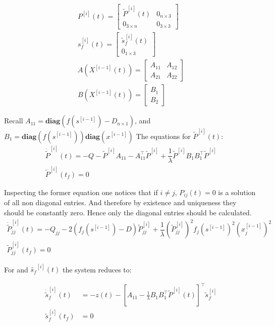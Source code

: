 \documentclass[3p,times]{elsarticle}
\newcommand{\diag}{\textbf{diag}}
\begin{document}
\begin{align}
P^{[i]}(t) = \begin{bmatrix}
\tilde{P}^{[i]}(t) & 0_{n\times 3} \\ 0_{3 \times n} & 0_{3 \times 3}
\end{bmatrix} \\
s_f^{[i]}(t) = \begin{bmatrix}
\tilde{s}_f^{[i]}(t) \\ 0_{1\times 3}
\end{bmatrix} \\
A\left (X^{[i-1]}(t)\right) = \begin{bmatrix}
A_{11} & A_{12} \\ A_{21} & A_{22}
\end{bmatrix} \\
B\left (X^{[i-1]}(t)\right) = \begin{bmatrix}
B_1 \\ B_2
\end{bmatrix} 
\end{align}


Recall $A_{11} = \diag \left( f\left(s^{[i-1]}\right)- D_{n\times 1} \right)$, and $B_1 = \diag\left(f\left(s^{[i-1]}\right)\right)\diag \left(x^{[i-1]} \right) $ The equations for $\tilde{P}^{[i]}(t)$:
\begin{align}
\dot{\tilde{P}}^{[i]}(t)= -Q- \tilde{P}^{[i]}A_{11} -A_{11}^\top \tilde{P}^{[i]} + \dfrac{1}{\lambda} \tilde{P}^{[i]}B_1B_1^\top \tilde{P}^{[i]} \\
\tilde{P}^{[i]}(t_f) = 0
\end{align}

Inspecting the former equation one notices that if $i\neq j$, $P_{ij}(t) = 0$ is a solution of all non diagonal entries. And therefore by existence and uniqueness they should be constantly zero. Hence only the diagonal entries should be calculated. 
\begin{align}
\dot{\tilde{P}}^{[i]}_{jj}(t)= -Q_{jj}- 2 \left(f_j\left(s^{[i-1]}\right)- D \right)\tilde{P}^{[i]}_{jj} + \dfrac{1}{\lambda}\left(\tilde{P}^{[i]}_{jj}\right)^2f_j\left(s^{[i-1]}\right)^2\left(x^{[i-1]}_j\right)^2  \\
\tilde{P}^{[i]}_{jj}(t_f) = 0
\end{align}

For and  $\tilde{s_f}^{[i]}(t)$ the system reduces to:

\begin{align}
\dot{\tilde{s}}_f^{[i]}(t) &= -z(t)- \left[A_{11} -\frac{1}{\lambda}B_1B_1^\top \tilde{P}^{[i]}(t) \right]^\top \tilde{s}_f^{[i]} \\
\tilde{s}_f^{[i]}(t_f) &= 0
\end{align}
\end{document}

